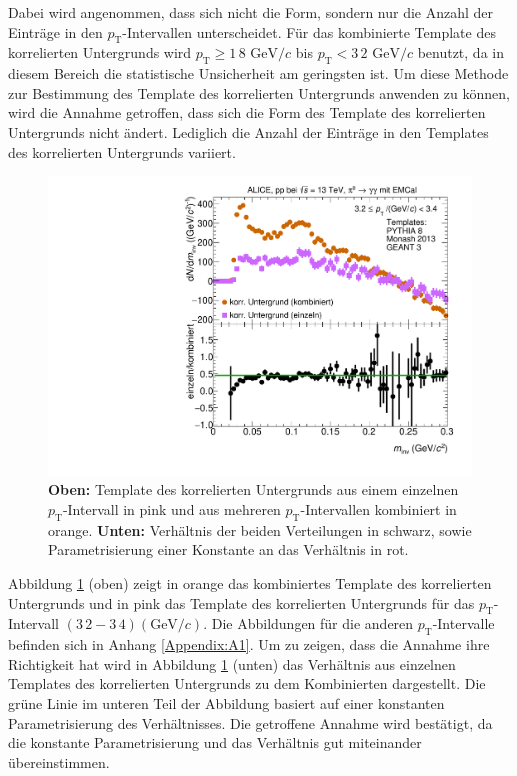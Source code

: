 Dabei wird angenommen, dass sich nicht die Form, sondern nur die Anzahl der Einträge in den $p_\text{T}$-Intervallen unterscheidet.  
Für das kombinierte Template des korrelierten Untergrunds wird $p_\text{T} \geq 1\,8\text{ GeV}/c$ bis $p_\text{T} < 3\,2\text{ GeV}/c$ benutzt, da in diesem Bereich die statistische Unsicherheit am geringsten ist.
Um diese Methode zur Bestimmung des Template des korrelierten Untergrunds anwenden zu können, wird die Annahme getroffen, dass sich die Form des Template des korrelierten Untergrunds nicht ändert.
Lediglich die Anzahl der Einträge in den Templates des korrelierten Untergrunds variiert.
\begin{figure}[t!]
\centering
\includegraphics[width=.7\linewidth]{BackgroundWithRatio10_Data_2016.pdf}
\caption{\textbf{Oben:} Template des korrelierten Untergrunds aus einem einzelnen $p_\text{T}$-Intervall in pink und aus mehreren $p_\text{T}$-Intervallen kombiniert in orange.
\textbf{Unten:} Verhältnis der beiden Verteilungen in schwarz, sowie Parametrisierung einer Konstante an das Verhältnis in rot.}
\label{fig:BkgTempRatio}
\end{figure}
\newline
Abbildung \ref{fig:BkgTempRatio} (oben) zeigt in orange das kombiniertes Template des korrelierten Untergrunds und in pink das Template des korrelierten Untergrunds für das $p_\text{T}$-Intervall $(3\,2 - 3\,4) (\text{GeV/}c)$.
Die Abbildungen für die anderen $p_\text{T}$-Intervalle befinden sich in Anhang \ref{Appendix:A1}.
Um zu zeigen, dass die Annahme ihre Richtigkeit hat wird in Abbildung \ref{fig:BkgTempRatio} (unten) das Verhältnis aus einzelnen Templates des korrelierten Untergrunds zu dem Kombinierten dargestellt.
Die grüne Linie im unteren Teil der Abbildung basiert auf einer konstanten Parametrisierung des Verhältnisses.
Die getroffene Annahme wird bestätigt, da die konstante Parametrisierung und das Verhältnis gut miteinander übereinstimmen.
